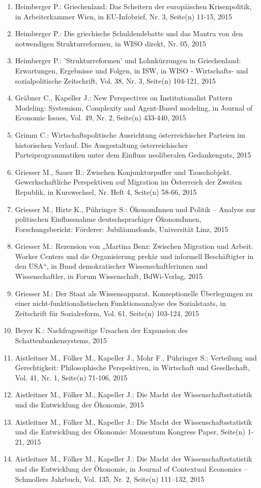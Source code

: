 \begin{enumerate}
	 \item Heimberger P.: Griechenland: Das Scheitern der europäischen Krisenpolitik, in Arbeiterkammer Wien, in EU-Infobrief, Nr. 3, Seite(n) 11-15, 2015
	 \item Heimberger P.: Die griechische Schuldendebatte und das Mantra von den \glqq notwendigen Strukturreformen\grqq{}, in WISO direkt, Nr. 05, 2015
	 \item Heimberger P.: 'Strukturreformen' und Lohnkürzungen in Griechenland: Erwartungen, Ergebnisse und Folgen, in ISW, in WISO - Wirtschafts- und sozialpolitische Zeitschrift, Vol. 38, Nr. 3, Seite(n) 104-121, 2015
	 \item Gräbner C., Kapeller J.: New Perspectives on  Institutionalist Pattern Modeling: Systemism, Complexity and  Agent-Based modeling, in Journal of Economic Issues, Vol. 49, Nr. 2, Seite(n) 433-440, 2015
	 \item Grimm C.: Wirtschaftspolitische Ausrichtung österreichischer Parteien im historischen Verlauf. Die Ausgestaltung österreichischer Parteiprogrammatiken unter dem Einfluss neoliberalen Gedankenguts, 2015
	 \item Griesser M., Sauer B.: Zwischen Konjunkturpuffer und Tauschobjekt. Gewerkschaftliche Perspektiven auf Migration im Österreich der Zweiten Republik, in Kurswechsel, Nr. Heft 4, Seite(n) 58-66, 2015
	 \item Griesser M., Hirte K., Pühringer S.: ÖkonomInnen und Politik – Analyse zur politischen Einflussnahme deutschsprachiger ÖkonomInnen, Forschungsbericht: Förderer: Jubiläumsfonds, Universität Linz, 2015
	 \item Griesser M.: Rezension von „Martina Benz: Zwischen Migration und Arbeit. Worker Centers und die Organisierung prekär und informell Beschäftigter in den USA“, in Bund demokratischer Wissenschaftlerinnen und Wissenschaftler, in Forum Wissenschaft, BdWi-Verlag, 2015
	 \item Griesser M.: Der Staat als Wissensapparat. Konzeptionelle Überlegungen zu einer nicht-funktionalistischen Funktionsanalyse des Sozialstaats, in Zeitschrift für Sozialreform, Vol. 61, Seite(n) 103-124, 2015
	 \item Beyer K.: Nachfrageseitige Ursachen der Expansion des Schattenbankensystems, 2015
	 \item Aistleitner M., Fölker M., Kapeller J., Mohr F., Pühringer S.: Verteilung und Gerechtigkeit: Philosophische  Perspektiven, in Wirtschaft und Gesellschaft, Vol. 41, Nr. 1, Seite(n) 71-106, 2015
	 \item Aistleitner M., Fölker M., Kapeller J.: Die Macht der Wissenschaftsstatistik und die Entwicklung der Ökonomie, 2015
	 \item Aistleitner M., Fölker M., Kapeller J.: Die Macht der Wissenschaftsstatistik und die Entwicklung der Ökonomie: Momentum Kongress Paper, Seite(n) 1-21, 2015
	 \item Aistleitner M., Fölker M., Kapeller J.: Die Macht der Wissenschaftsstatistik und die Entwicklung der Ökonomie, in Journal of Contextual Economics – Schmollers Jahrbuch, Vol. 135, Nr. 2, Seite(n) 111–132, 2015
\end{enumerate}

